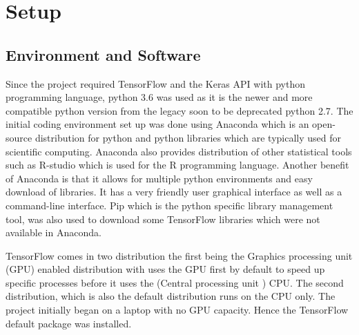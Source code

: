 \chapter{Setup}
\label{chapterlabel2}




\section{Environment and Software}
Since the project required TensorFlow and the Keras API with python programming language, python 3.6 was used as it is the newer and more compatible python version from the legacy soon to be deprecated python 2.7.
The initial coding environment set up was done using Anaconda which is  an open-source distribution for python and python libraries which are typically used for scientific computing. Anaconda also provides distribution of other statistical tools such as R-studio which is used for the R programming language.
Another benefit of Anaconda is that it allows for multiple python environments and easy download of libraries. It has a very friendly user graphical interface as well as a command-line interface.
Pip which is the python specific library management tool, was also used to download some TensorFlow libraries which were not available in Anaconda.

TensorFlow comes in two distribution the first being the Graphics processing unit (GPU) enabled distribution with uses the GPU first by default to speed up specific processes before it uses the (Central processing unit ) CPU.
The second distribution, which is also the default distribution runs on the CPU only.
The project initially began on a laptop with no GPU capacity. Hence the TensorFlow default package was installed.

